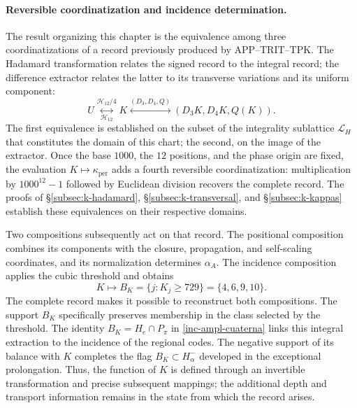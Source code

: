 \paragraph{Reversible coordinatization and incidence determination.}
\label{ampl-alfa-k-intro-reversible}
The result organizing this chapter is the equivalence among three
coordinatizations of a record previously produced by
APP--TRIT--TPK. The Hadamard transformation relates the signed record
to the integral record; the difference extractor relates
the latter to its transverse variations and its uniform component:
\[
 U\underset{\mathcal H_{12}}{\overset{\mathcal H_{12}/4}{\longleftrightarrow}}K
 \overset{(D_3,D_4,Q)}{\longleftrightarrow}
 (D_3K,D_4K,Q(K)).
\]
The first equivalence is established on the subset of the integrality
sublattice $\mathcal L_H$ that constitutes the domain of this chart; the
second, on the image of the extractor. Once the base $1000$, the $12$
positions, and the phase origin are fixed, the evaluation
$K\mapsto\kappa_{\mathrm{per}}$ adds a fourth reversible
coordinatization: multiplication by $1000^{12}-1$ followed by Euclidean
division recovers the complete record. The proofs of
\S\ref{subsec:k-hadamard}, \S\ref{subsec:k-transversal}, and
\S\ref{subsec:k-kappas} establish these equivalences on their respective
domains.

Two compositions subsequently act on that record. The positional
composition combines its components with the closure, propagation, and
self-scaling coordinates, and its normalization determines $\alpha_A$. The
incidence composition applies the cubic threshold and obtains
\[
 K\longmapsto B_K=\{j:K_j\geq729\}=\{4,6,9,10\}.
\]
The complete record makes it possible to reconstruct both compositions.
The support $B_K$ specifically preserves membership in the class selected
by the threshold. The identity $B_K=H_e\cap P_\pi$ in
\eqref{inc-ampl-cuaterna} links this integral extraction to the incidence
of the regional codes. The negative support of its balance with $K$
completes the flag $B_K\subset H^-_\alpha$ developed in the exceptional
prolongation. Thus, the function of $K$ is defined through an invertible
transformation and precise subsequent mappings; the additional depth and
transport information remains in the state from which the record arises.
